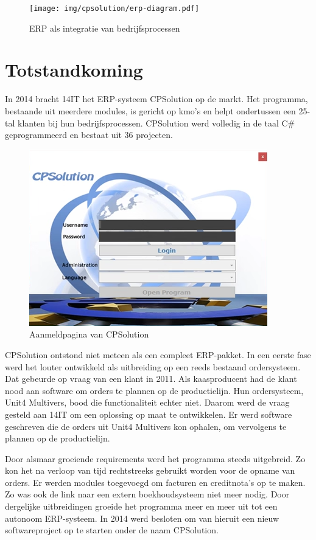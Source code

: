 \begin{figure}[H]
	\centering
	\texttt{[image: img/cpsolution/erp-diagram.pdf]}
	\caption{\label{fig:erp-diagram}ERP als integratie van bedrijfsprocessen~\autocite{Verbeiren2020}}
\end{figure}

\pagebreak

\section{Totstandkoming}
\label{sec:totstandkoming}
In 2014 bracht 14IT het ERP-systeem CPSolution op de markt. Het programma, bestaande uit meerdere modules, is gericht op kmo's en helpt ondertussen een 25-tal klanten bij hun bedrijfsprocessen. CPSolution werd volledig in de taal C\# geprogrammeerd en bestaat uit 36 projecten.

\begin{figure}[H]
	\centering
	\includegraphics[width=0.6\linewidth]{img/cpsolution/cpsolution.png}
	\caption{\label{fig:cpsolution}Aanmeldpagina van CPSolution}
\end{figure}

CPSolution ontstond niet meteen als een compleet ERP-pakket. In een eerste fase werd het louter ontwikkeld als uitbreiding op een reeds bestaand ordersysteem. Dat gebeurde op vraag van een klant in 2011. Als kaasproducent had de klant nood aan software om orders te plannen op de productielijn. Hun ordersysteem, Unit4 Multivers, bood die \mbox{functionaliteit} echter niet. Daarom werd de vraag gesteld aan 14IT om een oplossing op maat te ontwikkelen. Er werd software geschreven die de orders uit Unit4 Multivers kon ophalen, om vervolgens te plannen op de productielijn. 

Door alsmaar groeiende requirements werd het programma steeds uitgebreid. Zo kon het na verloop van tijd rechtstreeks gebruikt worden voor de opname van orders. Er werden modules toegevoegd om facturen en creditnota's op te maken. Zo was ook de link naar een extern boekhoudsysteem niet meer nodig. Door dergelijke uitbreidingen groeide het programma meer en meer uit tot een autonoom ERP-systeem. In 2014 werd besloten om van hieruit een nieuw softwareproject op te starten onder de naam CPSolution.


